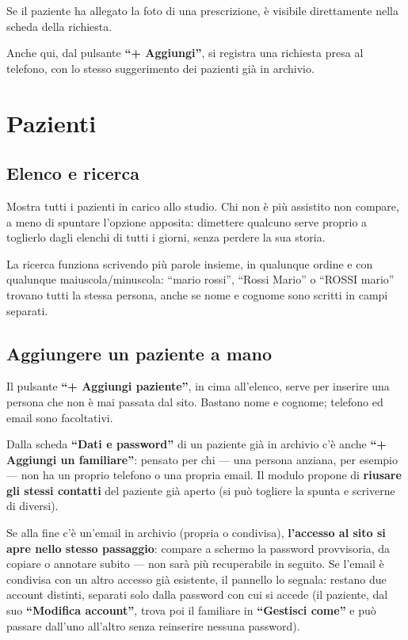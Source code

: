 \documentclass[11pt,a4paper]{article}
\newcommand{\bottone}[1]{\textbf{``#1''}}
\begin{document}
Se il paziente ha allegato la foto di una prescrizione, è visibile direttamente nella scheda della richiesta.

Anche qui, dal pulsante \bottone{+ Aggiungi}, si registra una richiesta presa al telefono, con lo stesso suggerimento dei pazienti già in archivio.

\section{Pazienti}

\subsection{Elenco e ricerca}

Mostra tutti i pazienti in carico allo studio. Chi non è più assistito non compare, a meno di spuntare l'opzione apposita: dimettere qualcuno serve proprio a toglierlo dagli elenchi di tutti i giorni, senza perdere la sua storia.

La ricerca funziona scrivendo più parole insieme, in qualunque ordine e con qualunque maiuscola/minuscola: ``mario rossi'', ``Rossi Mario'' o ``ROSSI mario'' trovano tutti la stessa persona, anche se nome e cognome sono scritti in campi separati.

\subsection{Aggiungere un paziente a mano}

Il pulsante \bottone{+ Aggiungi paziente}, in cima all'elenco, serve per inserire una persona che non è mai passata dal sito. Bastano nome e cognome; telefono ed email sono facoltativi.

Dalla scheda \bottone{Dati e password} di un paziente già in archivio c'è anche \bottone{+ Aggiungi un familiare}: pensato per chi --- una persona anziana, per esempio --- non ha un proprio telefono o una propria email. Il modulo propone di \textbf{riusare gli stessi contatti} del paziente già aperto (si può togliere la spunta e scriverne di diversi).

Se alla fine c'è un'email in archivio (propria o condivisa), \textbf{l'accesso al sito si apre nello stesso passaggio}: compare a schermo la password provvisoria, da copiare o annotare subito --- non sarà più recuperabile in seguito. Se l'email è condivisa con un altro accesso già esistente, il pannello lo segnala: restano due account distinti, separati solo dalla password con cui si accede (il paziente, dal suo \bottone{Modifica account}, trova poi il familiare in \bottone{Gestisci come} e può passare dall'uno all'altro senza reinserire nessuna password).
\end{document}
